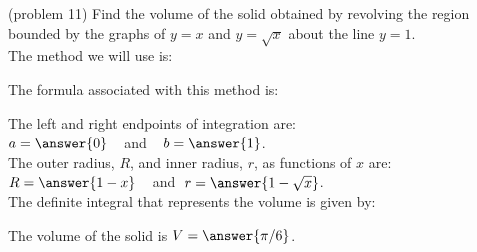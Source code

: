 \documentclass{ximera}
\begin{document}
\begin{problem}(problem 11)
Find the volume of the solid obtained by revolving the region bounded by the graphs of $y = x$ and $y = \sqrt x$ about the line $y = 1$.\\
The method we will use is:
\begin{multipleChoice}
\end{multipleChoice}

The formula associated with this method is:
\begin{multipleChoice}
\end{multipleChoice}

The left and right endpoints of integration are:\\
$a = \answer{0}\;\;\;$ and $\;\;\; b = \answer{1}$.\\
The outer radius, $R$, and inner radius, $r$, as functions of $x$ are:\\
$R = \answer{1-x} \;\;\;$ and $\; r = \answer{1-\sqrt{x}}$.\\

The definite integral that represents the volume is given by:\\
\begin{multipleChoice}
\end{multipleChoice}

The volume of the solid is $V = \answer{\pi/6}$.

\end{problem}
\end{document}
